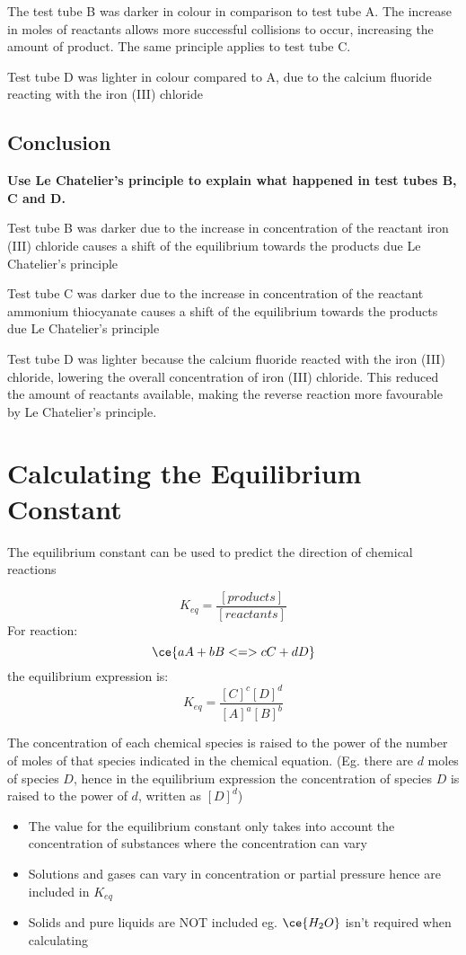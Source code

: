 		The test tube B was darker in colour in comparison to test tube A. The increase in moles of reactants allows more successful collisions to occur, increasing the amount of product. The same principle applies to test tube C.

		Test tube D was lighter in colour compared to A, due to the calcium fluoride reacting with the iron (III) chloride 

	\subsection{Conclusion}
		\textbf{Use Le Chatelier's principle to explain what happened in test tubes B, C and D.}

		Test tube B was darker due to the increase in concentration of the reactant iron (III) chloride causes a shift of the equilibrium towards the products due Le Chatelier's principle
		
		Test tube C was darker due to the increase in concentration of the reactant ammonium thiocyanate causes a shift of the equilibrium towards the products due Le Chatelier's principle

		Test tube D was lighter because the calcium fluoride reacted with the iron (III) chloride, lowering the overall concentration of iron (III) chloride. This reduced the amount of reactants available, making the reverse reaction more favourable by Le Chatelier's principle.

\section{Calculating the Equilibrium Constant} \label{5/11/2024}
	The equilibrium constant can be used to predict the direction of chemical reactions

	$$K_{eq} = \frac{[products]}{[reactants]}$$
	For reaction:
	$$\ce{aA + bB <=> cC + dD}$$
	the equilibrium expression is:
	$$K_{eq}=\frac{[C]^{c}[D]^{d}}{[A]^a[B]^b}$$

	The concentration of each chemical species is raised to the power of the number of moles of that species indicated in the chemical equation. (Eg. there are $d$ moles of species $D$, hence in the equilibrium expression the concentration of species $D$ is raised to the power of $d$, written as $[D]^d$)

	\begin{itemize}
		\item The value for the equilibrium constant only takes into account the concentration of substances where the concentration can vary
		\item Solutions and gases can vary in concentration or partial pressure hence are included in $K_{eq}$
		\item Solids and pure liquids are NOT included eg. $\ce{H_2O}$ isn't required when calculating
	\end{itemize}

